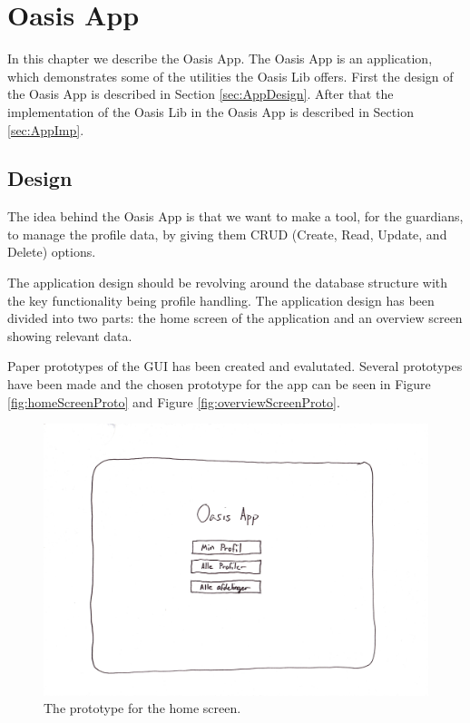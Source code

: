 \chapter{Oasis App}
\label{ch:App}
In this chapter we describe the Oasis App. The Oasis App is an application, which demonstrates some of the utilities the Oasis Lib offers. First the design of the Oasis App is described in Section \vref{sec:AppDesign}. After that the implementation of the Oasis Lib in the Oasis App is described in Section \vref{sec:AppImp}.

\section{Design}
\label{sec:AppDesign}
The idea behind the Oasis App is that we want to make a tool, for the guardians, to manage the profile data, by giving them CRUD (Create, Read, Update, and Delete) options.

The application design should be revolving around the database structure with the key functionality being profile handling.
The application design has been divided into two parts: the home screen of the application and an overview screen showing relevant data.

Paper prototypes of the GUI has been created and evalutated.
Several prototypes have been made and the chosen prototype for the app can be seen in Figure \vref{fig:homeScreenProto} and Figure \vref{fig:overviewScreenProto}.

\begin{figure}[H]
	\centering
		\includegraphics[width=\textwidth]{Images/homeScreenPrototype}
	\caption{The prototype for the home screen.}
	\label{fig:homeScreenProto}
\end{figure}

